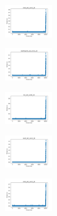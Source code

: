 \begin{figure}[H]
    \begin{subfigure}
        \centering
        \includegraphics[width=0.234\textwidth]{img/HS-LS/rand_set_const_20_277451237_time.png}
    \end{subfigure}
    \hfill
    \begin{subfigure}
        \centering
        \includegraphics[width=0.234\textwidth]{img/HS-LS/newthyroid_set_const_20_277451237_time.png}
    \end{subfigure}
    \hfill
    \begin{subfigure}
        \centering
        \includegraphics[width=0.234\textwidth]{img/HS-LS/iris_set_const_20_49258669_time.png}
    \end{subfigure}
    \hfill
    \begin{subfigure}
        \centering
        \includegraphics[width=0.234\textwidth]{img/HS-LS/ecoli_set_const_20_49258669_time.png}
    \end{subfigure}
    \hfill
    \begin{subfigure}
        \centering
        \includegraphics[width=0.234\textwidth]{img/HS-LS/rand_set_const_20_49258669_time.png}
    \end{subfigure}
    \hfill
    \begin{subfigure}
        \centering

\end{subfigure}
\end{figure}
